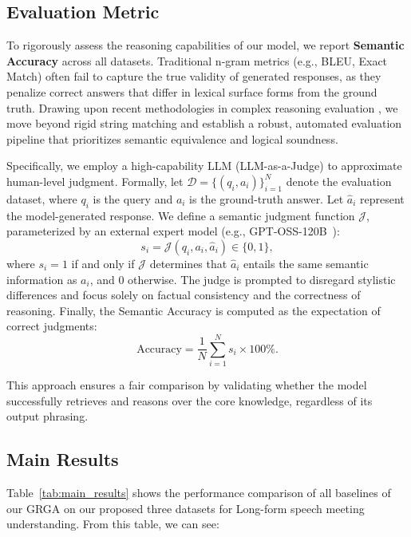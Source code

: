 \documentclass[11pt]{article}
\begin{document}
\subsection{Evaluation Metric}

To rigorously assess the reasoning capabilities of our model, we report \textbf{Semantic Accuracy} across all datasets. 
Traditional n-gram metrics (e.g., BLEU, Exact Match) often fail to capture the true validity of generated responses, as they penalize correct answers that differ in lexical surface forms from the ground truth. 
Drawing upon recent methodologies in complex reasoning evaluation \cite{mishra-etal-2025-investigating, shui-etal-2023-comprehensive}, we move beyond rigid string matching and establish a robust, automated evaluation pipeline that prioritizes semantic equivalence and logical soundness.

Specifically, we employ a high-capability LLM (LLM-as-a-Judge) to approximate human-level judgment. 
Formally, let $\mathcal{D} = \{(q_i, a_i)\}_{i=1}^{N}$ denote the evaluation dataset, where $q_i$ is the query and $a_i$ is the ground-truth answer. Let $\hat{a}_i$ represent the model-generated response. 
We define a semantic judgment function $\mathcal{J}$, parameterized by an external expert model (e.g., GPT-OSS-120B~\cite{openai2025gptoss120bgptoss20bmodel}):
\begin{equation}
    s_i = \mathcal{J}(q_i, a_i, \hat{a}_i) \in \{0, 1\},
\end{equation}
where $s_i = 1$ if and only if $\mathcal{J}$ determines that $\hat{a}_i$ entails the same semantic information as $a_i$, and $0$ otherwise. 
The judge is prompted to disregard stylistic differences and focus solely on factual consistency and the correctness of reasoning. 
Finally, the Semantic Accuracy is computed as the expectation of correct judgments:
\begin{equation}
\text{Accuracy} = \frac{1}{N} \sum_{i=1}^{N} s_i \times 100\%.
\end{equation}

This approach ensures a fair comparison by validating whether the model successfully retrieves and reasons over the core knowledge, regardless of its output phrasing.


\subsection{Main Results}
Table~\ref{tab:main_results} shows the performance comparison of all baselines of our GRGA on our proposed three datasets for Long-form speech meeting understanding. From this table, we can see:
\end{document}
